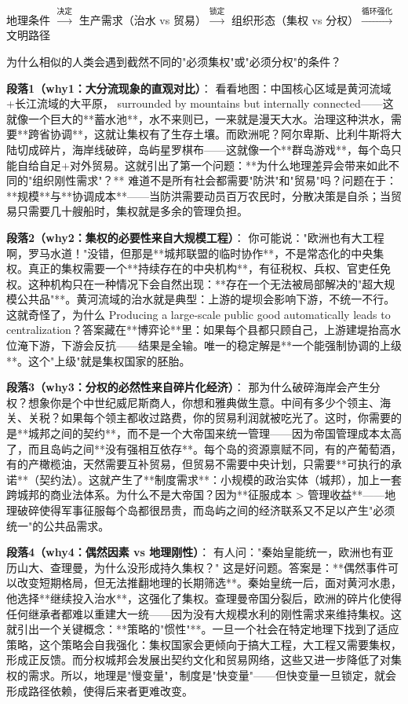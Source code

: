 \documentclass[openany, a4paper, 12pt]{book}
\newenvironment{logicmap}{
	\begin{tcolorbox}[
		colback=blue!5!white,      %
		colframe=blue!50!black,    %
		title=\textbf{逻辑地图 (Logic Map)}, %
		fonttitle=\bfseries,
		sharp corners=south,       %
		boxrule=0.5mm
		]
	\centering
	}{
	\end{tcolorbox}
}
\begin{document}
	\begin{logicmap}
		地理条件 $\xrightarrow{\text{决定}}$ 生产需求（治水 vs 贸易）$\xrightarrow{\text{锁定}}$ 组织形态（集权 vs 分权）$\xrightarrow{\text{循环强化}}$ 文明路径
	\end{logicmap}
	
	\begin{questionbox}
		为什么相似的人类会遇到截然不同的"必须集权"或"必须分权"的条件？
	\end{questionbox}
	
	\textbf{段落1（why1：大分流现象的直观对比）}：  
	看看地图：中国核心区域是黄河流域+长江流域的大平原， surrounded by mountains but internally connected——这就像一个巨大的**蓄水池**，水不来则已，一来就是漫天大水。治理这种洪水，需要**跨省协调**，这就让集权有了生存土壤。而欧洲呢？阿尔卑斯、比利牛斯将大陆切成碎片，海岸线破碎，岛屿星罗棋布——这就像一个**群岛游戏**，每个岛只能自给自足+对外贸易。这就引出了第一个问题：**为什么地理差异会带来如此不同的"组织刚性需求"？** 难道不是所有社会都需要"防洪"和"贸易"吗？问题在于：**规模**与**协调成本**——当防洪需要动员百万农民时，分散决策是自杀；当贸易只需要几十艘船时，集权就是多余的管理负担。
	
	\textbf{段落2（why2：集权的必要性来自大规模工程）}：  
	你可能说："欧洲也有大工程啊，罗马水道！"没错，但那是**城邦联盟的临时协作**，不是常态化的中央集权。真正的集权需要一个**持续存在的中央机构**，有征税权、兵权、官吏任免权。这种机构只在一种情况下会自然出现：**存在一个无法被局部解决的"超大规模公共品"**。黄河流域的治水就是典型：上游的堤坝会影响下游，不统一不行。这就奇怪了，为什么 Producing a large-scale public good automatically leads to centralization？答案藏在**博弈论**里：如果每个县都只顾自己，上游建堤抬高水位淹下游，下游会反抗——结果是全输。唯一的稳定解是**一个能强制协调的上级**。这个"上级"就是集权国家的胚胎。
	
	\textbf{段落3（why3：分权的必然性来自碎片化经济）}：  
	那为什么破碎海岸会产生分权？想象你是个中世纪威尼斯商人，你想和雅典做生意。中间有多少个领主、海关、关税？如果每个领主都收过路费，你的贸易利润就被吃光了。这时，你需要的是**城邦之间的契约**，而不是一个大帝国来统一管理——因为帝国管理成本太高了，而且岛屿之间**没有强相互依存**。每个岛的资源禀赋不同，有的产葡萄酒，有的产橄榄油，天然需要互补贸易，但贸易不需要中央计划，只需要**可执行的承诺**（契约法）。这就产生了**制度需求**：小规模的政治实体（城邦），加上一套跨城邦的商业法体系。为什么不是大帝国？因为**征服成本 > 管理收益**——地理破碎使得军事征服每个岛都很昂贵，而岛屿之间的经济联系又不足以产生"必须统一"的公共品需求。
	
	\textbf{段落4（why4：偶然因素 vs 地理刚性）}：  
	有人问："秦始皇能统一，欧洲也有亚历山大、查理曼，为什么没形成持久集权？" 这是好问题。答案是：**偶然事件可以改变短期格局，但无法推翻地理的长期筛选**。秦始皇统一后，面对黄河水患，他选择**继续投入治水**，这强化了集权。查理曼帝国分裂后，欧洲的碎片化使得任何继承者都难以重建大一统——因为没有大规模水利的刚性需求来维持集权。这就引出一个关键概念：**策略的"惯性"**。一旦一个社会在特定地理下找到了适应策略，这个策略会自我强化：集权国家会更倾向于搞大工程，大工程又需要集权，形成正反馈。而分权城邦会发展出契约文化和贸易网络，这些又进一步降低了对集权的需求。所以，地理是"慢变量"，制度是"快变量"——但快变量一旦锁定，就会形成路径依赖，使得后来者更难改变。
	
\end{document}
